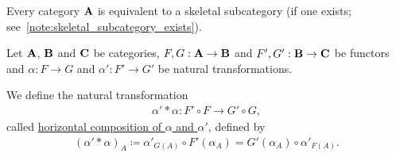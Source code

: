 \begin{proposition}\label{thm:skeletal_subcategory_equivalence}\cite[91]{MacLane1994}
  Every category $\operatorname{\mathbf{A}}$ is equivalent to a skeletal subcategory (if one exists; see~\cref{note:skeletal_subcategory_exists}).
\end{proposition}

\begin{definition}\label{def:natural_transformation_horizontal_composition}\cite[remarks 1.3.24]{Leinster2014}
  Let $\operatorname{\mathbf{A}}$, $\operatorname{\mathbf{B}}$ and $\operatorname{\mathbf{C}}$ be categories, $F, G: \operatorname{\mathbf{A}} \to \operatorname{\mathbf{B}}$ and $F', G': \operatorname{\mathbf{B}} \to \operatorname{\mathbf{C}}$ be functors and $\alpha: F \to G$ and $\alpha': F' \to G'$ be natural transformations.
  \begin{Center}
  \end{Center}

  We define the natural transformation
  \begin{align*}
    \alpha' * \alpha: F' \circ F \to G' \circ G,
  \end{align*}
  called \ul{horizontal composition of $\alpha$ and $\alpha'$}, defined by
  \begin{align*}
    (\alpha' * \alpha)_A \coloneqq \alpha'_{G(A)} \circ F'(\alpha_A) = G'(\alpha_A) \circ \alpha'_{F(A)}.
  \end{align*}
\end{definition}

